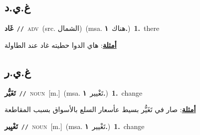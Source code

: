 \documentclass[10pt,a4paper,twoside]{article} %
\begin{document}
\begin{multicols}{2}
\vspace{-3mm}
\subsection*{\color{blue}\foreignlanguage{arabic}{غ.ي.د}\color{blue}{}} 

{\setlength\topsep{0pt}\textbf{\foreignlanguage{arabic}{غَاد}}\ {\color{gray}\texttt{//}\color{black}}\ \textsc{adv}\ (src. \color{gray}\foreignlanguage{arabic}{الشمال}\color{black})\ \color{gray}(msa. \foreignlanguage{arabic}{هناك}~\foreignlanguage{arabic}{\textbf{١.}})\color{black}\ \textbf{1.}~there\  \begin{flushright}\color{gray}\foreignlanguage{arabic}{\textbf{\underline{\foreignlanguage{arabic}{أمثلة}}}: هاي الدوا حطيته غاد عند الطاولة}\end{flushright}\color{black}} \vspace{2mm}

\vspace{-3mm}
\subsection*{\color{blue}\foreignlanguage{arabic}{غ.ي.ر}\color{blue}{}} 

{\setlength\topsep{0pt}\textbf{\foreignlanguage{arabic}{تَغَيُّر}}\ {\color{gray}\texttt{//}\color{black}}\ \textsc{noun}\ [m.]\ \color{gray}(msa. \foreignlanguage{arabic}{تَغْيير}~\foreignlanguage{arabic}{\textbf{١.}})\color{black}\ \textbf{1.}~change\  \begin{flushright}\color{gray}\foreignlanguage{arabic}{\textbf{\underline{\foreignlanguage{arabic}{أمثلة}}}: صار في تَغَيُّر بسيط عأسعار السلع بالأسواق بسبب المقاطعة}\end{flushright}\color{black}} \vspace{2mm}

{\setlength\topsep{0pt}\textbf{\foreignlanguage{arabic}{تَغْيِير}}\ {\color{gray}\texttt{//}\color{black}}\ \textsc{noun}\ [m.]\ \color{gray}(msa. \foreignlanguage{arabic}{تَغْيير}~\foreignlanguage{arabic}{\textbf{١.}})\color{black}\ \textbf{1.}~change\ } \vspace{2mm}


\end{multicols}
\end{document}
